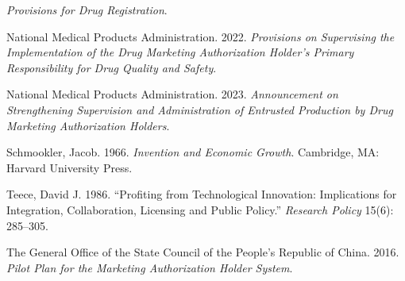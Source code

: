 \documentclass[12pt,UTF8]{ctexart}
\theoremstyle{plain}
\theoremstyle{remark}
\begin{document}
\begin{enumerate}[leftmargin=2em,label={[\arabic*]}]
    \textit{Provisions for Drug Registration}.
    \item National Medical Products Administration. 2022.
    \textit{Provisions on Supervising the Implementation of the Drug Marketing Authorization Holder's Primary Responsibility for Drug Quality and Safety}.
    \item National Medical Products Administration. 2023.
    \textit{Announcement on Strengthening Supervision and Administration of Entrusted Production by Drug Marketing Authorization Holders}.
    \item Schmookler, Jacob. 1966.
    \textit{Invention and Economic Growth}. Cambridge, MA: Harvard University Press.
    \item Teece, David J. 1986.
    ``Profiting from Technological Innovation:
    Implications for Integration, Collaboration, Licensing and Public Policy.''
    \textit{Research Policy} 15(6): 285--305.
    \item The General Office of the State Council of the People's Republic of China. 2016.
    \textit{Pilot Plan for the Marketing Authorization Holder System}.
\end{enumerate}
\end{document}
